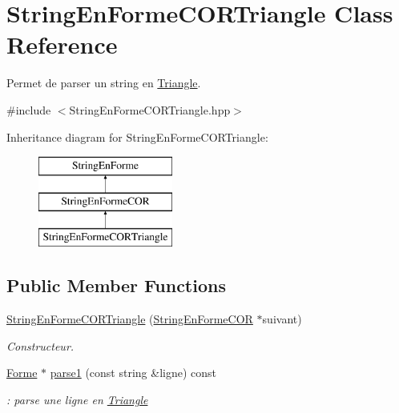 \hypertarget{class_string_en_forme_c_o_r_triangle}{}\section{String\+En\+Forme\+C\+O\+R\+Triangle Class Reference}
\label{class_string_en_forme_c_o_r_triangle}


Permet de parser un string en \mbox{\hyperlink{class_triangle}{Triangle}}.  




{\ttfamily \#include $<$String\+En\+Forme\+C\+O\+R\+Triangle.\+hpp$>$}

Inheritance diagram for String\+En\+Forme\+C\+O\+R\+Triangle\+:\begin{figure}[H]
\begin{center}
\leavevmode
\includegraphics[height=3.000000cm]{class_string_en_forme_c_o_r_triangle}
\end{center}
\end{figure}
\subsection*{Public Member Functions}
\begin{DoxyCompactItemize}
\item 
\mbox{\hyperlink{class_string_en_forme_c_o_r_triangle_ad8282a5aafd00f47d185b276637f00ff}{String\+En\+Forme\+C\+O\+R\+Triangle}} (\mbox{\hyperlink{class_string_en_forme_c_o_r}{String\+En\+Forme\+C\+OR}} $\ast$suivant)
\begin{DoxyCompactList}\small\item\em Constructeur. \end{DoxyCompactList}\item 
\mbox{\hyperlink{class_forme}{Forme}} $\ast$ \mbox{\hyperlink{class_string_en_forme_c_o_r_triangle_aa8ef1e1cedf6e3314209b0ed695d4416}{parse1}} (const string \&ligne) const
\begin{DoxyCompactList}\small\item\em \+: parse une ligne en \mbox{\hyperlink{class_triangle}{Triangle}} \end{DoxyCompactList}\end{DoxyCompactItemize}



